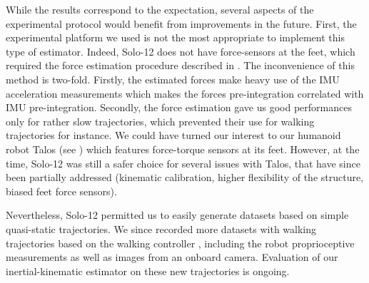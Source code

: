 While the results correspond to the expectation, several aspects of the experimental protocol would benefit from 
improvements in the future. First, the experimental platform we used is not the most appropriate to implement this type of estimator.
Indeed, Solo-12 does not have force-sensors at the feet, which required the force estimation procedure described in .
The inconvenience of this method is two-fold. Firstly, the estimated forces make heavy use of the IMU acceleration measurements which makes the forces pre-integration
correlated with IMU pre-integration. Secondly, the force estimation gave us good performances only for rather slow trajectories, which prevented their use for walking
trajectories for instance. We could have turned our interest to our humanoid robot Talos (see ) which features force-torque sensors at its feet.
However, at the time, Solo-12 was still a safer choice for several issues with Talos, that have since been partially addressed (kinematic calibration, higher flexibility of the 
structure, biased feet force sensors). 



Nevertheless, Solo-12 permitted us to easily generate datasets based on simple quasi-static trajectories. We since recorded more datasets with walking trajectories
based on the walking controller \cite{leziart2021implementation}, including the robot proprioceptive measurements as well as images from an onboard camera. Evaluation
of our inertial-kinematic estimator on these new trajectories is ongoing.

